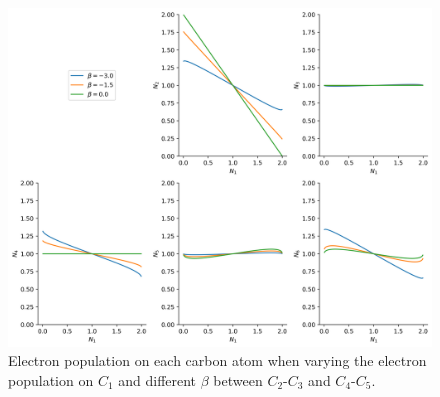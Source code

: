 \documentclass[twoside,twocolumn,9pt]{article}
\begin{document}
\begin{center}
  \begin{figure}[!htbp]
      \includegraphics[width=\textwidth]{Benzene-electronpopulation-on-atoms-potential-and-two-betas-to-zero-not-adjacent.png}
      \caption{Electron population on each carbon atom when varying the electron population on $C_1$ and different $\beta$ between $C_2$-$C_3$ and $C_4$-$C_5$.}
      \label{Diels-alder-2-electronpopulation}
  \end{figure}
\end{center}
\end{document}
